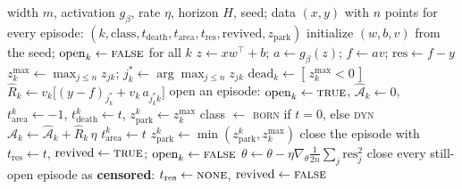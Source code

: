 \documentclass[11pt]{article}
\theoremstyle{definition}
\theoremstyle{remark}
\newcommand{\Ar}{\mathcal{A}}                      %
\begin{document}
\begin{algorithm}[t]
\caption{Ground-truth area clock (deterministic MLP, $T=0$).}
\label{alg:regua}
\begin{algorithmic}[1]
\REQUIRE width $m$, activation $g_\beta$, rate $\eta$, horizon $H$, seed; data
$(x,y)$ with $n$ points
\ENSURE for every episode: $(k,\text{class},t_{\mathrm{death}},
t_{\mathrm{area}},t_{\mathrm{res}},\text{revived},z_{\mathrm{park}})$
\STATE initialize $(w,b,v)$ from the seed;
$\mathrm{open}_k\leftarrow\textsc{false}$ for all $k$
  \STATE $z\leftarrow xw^\top+b$; \; $a\leftarrow g_\beta(z)$; \;
         $f\leftarrow av$; \; $\mathrm{res}\leftarrow f-y$
  \STATE $z^{\max}_k\leftarrow\max_{j\le n}z_{jk}$; \;
         $j^\ast_k\leftarrow\arg\max_{j\le n}z_{jk}$
  \STATE $\mathrm{dead}_k\leftarrow[\,z^{\max}_k<0\,]$
  \STATE $\hat R_k\leftarrow v_k\bigl[(y-f)_{j^\ast_k}+v_k\,a_{j^\ast_k k}\bigr]$
    \STATE open an episode: $\mathrm{open}_k\leftarrow\textsc{true}$,
           $\hat{\Ar}_k\leftarrow0$, $t_{\mathrm{area}}^{k}\leftarrow-1$,
           $t_{\mathrm{death}}^{k}\leftarrow t$,
           $z^k_{\mathrm{park}}\leftarrow z^{\max}_k$
    \STATE class $\leftarrow$ \textsc{born} if $t=0$, else \textsc{dyn}
  \ENDFOR
    \STATE $\hat{\Ar}_k\leftarrow\hat{\Ar}_k+\hat R_k\,\eta$
    \IF{$t_{\mathrm{area}}^{k}<0$ \AND $\hat{\Ar}_k>0$}
      \STATE $t_{\mathrm{area}}^{k}\leftarrow t$ 
    \ENDIF
    \STATE $z^k_{\mathrm{park}}\leftarrow\min(z^k_{\mathrm{park}},z^{\max}_k)$
  \ENDFOR
    \STATE close the episode with $t_{\mathrm{res}}\leftarrow t$,
           $\text{revived}\leftarrow\textsc{true}$;
           $\mathrm{open}_k\leftarrow\textsc{false}$
  \ENDFOR
  \STATE $\theta\leftarrow\theta-\eta\nabla_\theta\tfrac1{2n}\sum_j\mathrm{res}_j^2$
\ENDFOR
\STATE close every still-open episode as \textbf{censored}:
       $t_{\mathrm{res}}\leftarrow\textsc{none}$,
       $\text{revived}\leftarrow\textsc{false}$
\end{algorithmic}
\end{algorithm}
\end{document}

